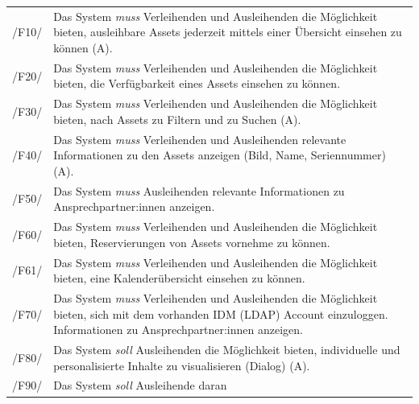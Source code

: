 \begin{center}
        \renewcommand{\arraystretch}{1.5}
        \begin{longtable}{lp{}} \arrayrulecolor{maincolor}\hline
                 \sffamily\color{maincolor}/F10/  & Das System \textit{muss} Verleihenden und
                Ausleihenden die Möglichkeit bieten, ausleihbare Assets jederzeit mittels einer
                Übersicht einsehen zu können (A). \\
                 \sffamily\color{maincolor}/F20/  & Das System \textit{muss}  Verleihenden und
                 Ausleihenden die Möglichkeit bieten, die Verfügbarkeit eines Assets einsehen zu
                 können. \\
                 \sffamily\color{maincolor}/F30/  & Das System \textit{muss} Verleihenden und
                 Ausleihenden die Möglichkeit bieten, nach Assets zu Filtern und zu Suchen (A). \\
                 \sffamily\color{maincolor}/F40/  & Das System \textit{muss}  Verleihenden und
                Ausleihenden relevante Informationen zu den Assets anzeigen (Bild, Name,
                Seriennummer) (A). \\
                 \sffamily\color{maincolor}/F50/  & Das System \textit{muss}  Ausleihenden relevante
                 Informationen zu Ansprechpartner:innen anzeigen. \\
                 \sffamily\color{maincolor}/F60/  & Das System \textit{muss} Verleihenden und
                 Ausleihenden die Möglichkeit bieten, Reservierungen von Assets vornehme zu können.
                 \\
                 \sffamily\color{maincolor}/F61/  & Das System \textit{muss} Verleihenden und
                 Ausleihenden die Möglichkeit bieten, eine Kalenderübersicht einsehen zu können. \\
                 \sffamily\color{maincolor}/F70/  & Das System \textit{muss} Verleihenden und
                 Ausleihenden die Möglichkeit bieten, sich mit dem vorhanden IDM (LDAP) Account
                 einzuloggen. Informationen zu Ansprechpartner:innen anzeigen. \\
                 \sffamily\color{maincolor}/F80/  & Das System \textit{soll} Ausleihenden die
                Möglichkeit bieten, individuelle und personalisierte Inhalte zu visualisieren
                (Dialog) (A). \\
                 \sffamily\color{maincolor}/F90/  & Das System \textit{soll} Ausleihende daran

\end{longtable}
\end{center}
